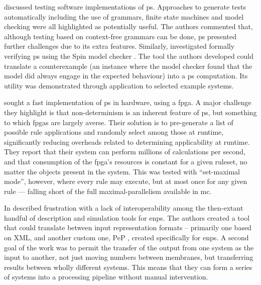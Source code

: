 \citeauthor{Gheorghe2010} \cite{Gheorghe2010} discussed testing software implementations of \gls{ps}.  Approaches to generate tests automatically including the use of grammars, finite state machines and model checking were all highlighted as potentially useful.  The authors commented that, although testing based on context-free grammars can be done, \gls{ps} presented further challenges due to its extra features.  Similarly, \citeauthor{Lefticaru2011} \cite{Lefticaru2011} investigated formally verifying \gls{ps} using the Spin model checker \cite{Ben-Ari2008}.  The tool the authors developed could translate a counterexample (an instance where the model checker found that the model did always engage in the expected behaviour) into a \gls{ps} computation.  Its utility was demonstrated through application to selected example systems.

\citeauthor{Verlan2012} \cite{Verlan2012} sought a fast implementation of \gls{ps} in hardware, using a \gls{fpga}.  A major challenge they highlight is that non-determinism is an inherent feature of \gls{ps}, but something to which \glspl{fpga} are largely averse.  Their solution is to pre-generate a list of possible rule applications and randomly select among those at runtime, significantly reducing overheads related to determining applicability at runtime.  They report that their system can perform millions of calculations per second, and that consumption of the \gls{fpga}'s resources is constant for a given ruleset, no matter the objects present in the system.  This was tested with ``set-maximal mode'', however, where every rule may execute, but at most once for any given rule --- falling short of the full maximal-parallelism available in \gls{mc}.

In \cite{Raghavan2020a} \citeauthor{Raghavan2020a} described frustration with a lack of interoperability among the then-extant handful of description and simulation tools for \gls{enps}.  The authors created a tool that could translate between input representation formats -- primarily one based on XML, and another custom one, PeP \cite{Florea2017,Florea2018}, created specifically for \gls{enps}.  A second goal of the work was to permit the transfer of the output from one system as the input to another, \ie{} not just moving numbers between membranes, but transferring results between wholly different systems.  This means that they can form a series of systems into a processing pipeline without manual intervention.

